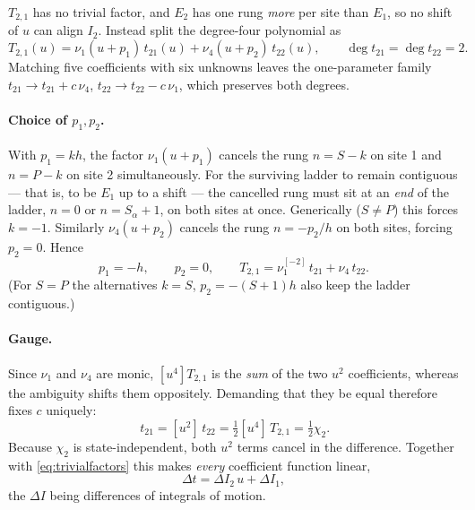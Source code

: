 \documentclass[11pt]{article}
\newcommand{\shift}[1]{^{[#1]}}
\begin{document}
$T_{2,1}$ has no trivial factor, and $E_2$ has one rung \emph{more} per site than $E_1$, so no
shift of $u$ can align $I_2$. Instead split the degree-four polynomial as
\begin{equation}
T_{2,1}(u) = \nu_1(u+p_1)\,t_{21}(u) + \nu_4(u+p_2)\,t_{22}(u) , \qquad
\deg t_{21} = \deg t_{22} = 2 .
\label{eq:split}
\end{equation}
Matching five coefficients with six unknowns leaves the one-parameter family
$t_{21}\to t_{21}+c\,\nu_4$, $t_{22}\to t_{22}-c\,\nu_1$, which preserves both degrees.

\paragraph{Choice of $p_1,p_2$.} With $p_1 = kh$, the factor $\nu_1(u+p_1)$ cancels the rung
$n = S-k$ on site 1 and $n = P-k$ on site 2 simultaneously. For the surviving ladder to remain
contiguous --- that is, to be $E_1$ up to a shift --- the cancelled rung must sit at an \emph{end}
of the ladder, $n=0$ or $n=S_\alpha+1$, on both sites at once. Generically ($S\neq P$) this forces
$k=-1$. Similarly $\nu_4(u+p_2)$ cancels the rung $n=-p_2/h$ on both sites, forcing $p_2=0$. Hence
\begin{equation}
p_1 = -h , \qquad p_2 = 0 , \qquad
T_{2,1} = \nu_1\shift{-2}\,t_{21} + \nu_4\,t_{22} .
\label{eq:p1p2}
\end{equation}
(For $S=P$ the alternatives $k=S$, $p_2=-(S+1)h$ also keep the ladder contiguous.)

\paragraph{Gauge.} Since $\nu_1$ and $\nu_4$ are monic, $[u^4]T_{2,1}$ is the \emph{sum} of the two
$u^2$ coefficients, whereas the ambiguity shifts them oppositely. Demanding that they be equal
therefore fixes $c$ uniquely:
\begin{equation}
[u^2]\,t_{21} = [u^2]\,t_{22} = \tfrac12 [u^4]\,T_{2,1} = \tfrac12 \chi_2 .
\label{eq:gauge}
\end{equation}
Because $\chi_2$ is state-independent, both $u^2$ terms cancel in the difference. Together with
\eqref{eq:trivialfactors} this makes \emph{every} coefficient function linear,
\begin{equation}
\Delta t = \Delta I_2\, u + \Delta I_1 ,
\label{eq:linear}
\end{equation}
the $\Delta I$ being differences of integrals of motion.
\end{document}
